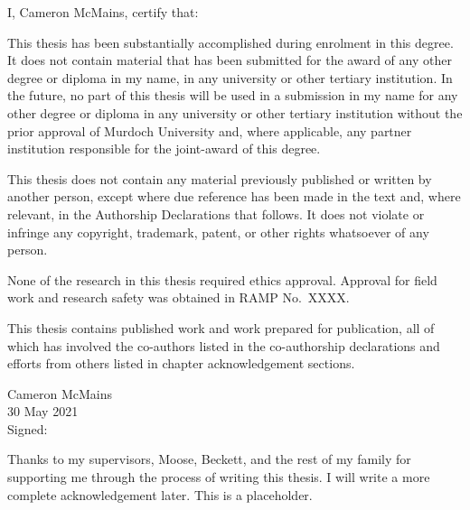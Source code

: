 \documentclass[a4paper, nobind]{templates/ociamthesis}
\begin{document}
\begin{romanpages}

\maketitle

\begin{declaration}
 	I, Cameron McMains, certify that:

  This thesis has been substantially accomplished during enrolment in this degree. It does not contain material that has been submitted for the award of any other degree or diploma in my name, in any university or other tertiary institution. In the future, no part of this thesis will be used in a submission in my name for any other degree or diploma in any university or other tertiary institution without the prior approval of Murdoch University and, where applicable, any partner institution responsible for the joint-award of this degree.

  This thesis does not contain any material previously published or written by another person, except where due reference has been made in the text and, where relevant, in the Authorship Declarations that follows. It does not violate or infringe any copyright, trademark, patent, or other rights whatsoever of any person.

  None of the research in this thesis required ethics approval. Approval for field work and research safety was obtained in RAMP No.~XXXX.

  This thesis contains published work and work prepared for publication, all of which has involved the co-authors listed in the co-authorship declarations and efforts from others listed in chapter acknowledgement sections.

  \begin{flushright}
  Cameron McMains \\
  30 May 2021 \\
  Signed:
  \end{flushright}
\end{declaration}

%
\begin{acknowledgements}
 	Thanks to my supervisors, Moose, Beckett, and the rest of my family for supporting me through the process of writing this thesis. I will write a more complete acknowledgement later. This is a placeholder.
\end{acknowledgements}


\end{romanpages}
\end{document}
